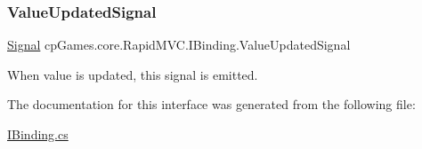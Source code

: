 \mbox{\label{interfacecp_games_1_1core_1_1_rapid_m_v_c_1_1_i_binding_a24032f62e91ba7f08581be9afd09b2c7}} 
\subsubsection{\texorpdfstring{ValueUpdatedSignal}{ValueUpdatedSignal}}
{\footnotesize\ttfamily \mbox{\hyperlink{classcp_games_1_1core_1_1_rapid_m_v_c_1_1_signal}{Signal}} cp\+Games.\+core.\+Rapid\+M\+V\+C.\+I\+Binding.\+Value\+Updated\+Signal\hspace{0.3cm}{\ttfamily [get]}}



When value is updated, this signal is emitted. 



The documentation for this interface was generated from the following file\+:\begin{DoxyCompactItemize}
\item 
\mbox{\hyperlink{_i_binding_8cs}{I\+Binding.\+cs}}\end{DoxyCompactItemize}
